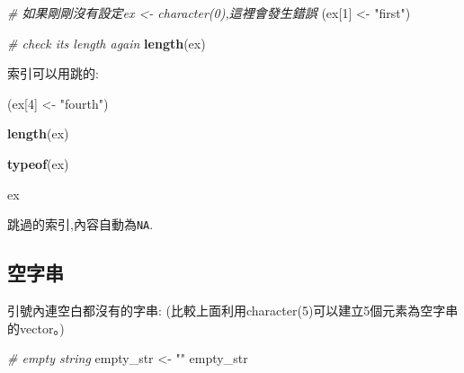 \documentclass[]{book}
\newenvironment{Shaded}{\begin{snugshade}}{\end{snugshade}}
\newcommand{\KeywordTok}[1]{\textcolor[rgb]{0.13,0.29,0.53}{\textbf{#1}}}
\newcommand{\DecValTok}[1]{\textcolor[rgb]{0.00,0.00,0.81}{#1}}
\newcommand{\StringTok}[1]{\textcolor[rgb]{0.31,0.60,0.02}{#1}}
\newcommand{\CommentTok}[1]{\textcolor[rgb]{0.56,0.35,0.01}{\textit{#1}}}
\newcommand{\NormalTok}[1]{#1}
\theoremstyle{definition}
\theoremstyle{definition}
\theoremstyle{definition}
\theoremstyle{remark}
\begin{document}
\begin{Shaded}
\begin{Highlighting}[]
\CommentTok{# 如果剛剛沒有設定ex <- character(0),這裡會發生錯誤}
\NormalTok{(ex[}\DecValTok{1}\NormalTok{] <-}\StringTok{ "first"}\NormalTok{)}
\end{Highlighting}
\end{Shaded}

\begin{Shaded}
\begin{Highlighting}[]
\CommentTok{# check its length again}
\KeywordTok{length}\NormalTok{(ex)}
\end{Highlighting}
\end{Shaded}

索引可以用跳的:

\begin{Shaded}
\begin{Highlighting}[]
\NormalTok{(ex[}\DecValTok{4}\NormalTok{] <-}\StringTok{ "fourth"}\NormalTok{)}
\end{Highlighting}
\end{Shaded}

\begin{Shaded}
\begin{Highlighting}[]
\KeywordTok{length}\NormalTok{(ex)}
\end{Highlighting}
\end{Shaded}

\begin{Shaded}
\begin{Highlighting}[]
\KeywordTok{typeof}\NormalTok{(ex)}
\end{Highlighting}
\end{Shaded}

\begin{Shaded}
\begin{Highlighting}[]
\NormalTok{ex}
\end{Highlighting}
\end{Shaded}

跳過的索引,內容自動為\texttt{NA}.

\subsection{空字串}

引號內連空白都沒有的字串:
(比較上面利用character(5)可以建立5個元素為空字串的vector。)

\begin{Shaded}
\begin{Highlighting}[]
\CommentTok{# empty string}
\NormalTok{empty_str <-}\StringTok{ ""}
\NormalTok{empty_str}
\end{Highlighting}
\end{Shaded}
\end{document}
